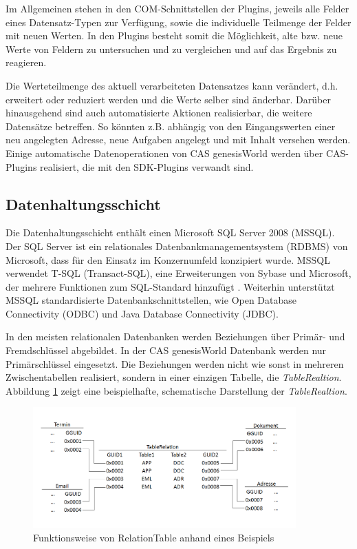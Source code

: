 Im Allgemeinen stehen in den COM-Schnittstellen der Plugins, jeweils alle Felder eines Datensatz-Typen zur Verfügung, sowie die individuelle Teilmenge der Felder mit neuen Werten. In den Plugins besteht somit die Möglichkeit, alte bzw. neue Werte von Feldern zu untersuchen und zu vergleichen und auf das Ergebnis zu reagieren.

Die Werteteilmenge des aktuell verarbeiteten Datensatzes kann verändert, d.h. erweitert oder reduziert werden und die Werte selber sind änderbar. Darüber hinausgehend sind auch automatisierte Aktionen realisierbar, die weitere Datensätze betreffen. So könnten z.B. abhängig von den Eingangswerten einer neu angelegten Adresse, neue Aufgaben angelegt und mit Inhalt versehen werden. Einige automatische Datenoperationen von CAS genesisWorld werden über CAS-Plugins realisiert, die mit den SDK-Plugins verwandt sind.

\subsection{Datenhaltungsschicht}
\label{ch:Systemanalyse:sec:genesisWorld:subsec:db}

Die Datenhaltungsschicht enthält einen Microsoft SQL Server 2008 (MSSQL). Der SQL Server ist ein relationales Datenbankmanagementsystem (RDBMS) von Microsoft, dass für den Einsatz im Konzernumfeld konzipiert wurde. MSSQL verwendet T-SQL (Transact-SQL), eine Erweiterungen von Sybase und Microsoft, der mehrere Funktionen zum SQL-Standard hinzufügt \cite{tech2013}. Weiterhin unterstützt MSSQL standardisierte Datenbankschnittstellen, wie Open Database Connectivity (ODBC) und Java Database Connectivity (JDBC).
  
In den meisten relationalen Datenbanken werden Beziehungen über Primär- und Fremdschlüssel abgebildet. In der CAS genesisWorld Datenbank werden nur Primärschlüssel eingesetzt. Die Beziehungen werden nicht wie sonst in mehreren Zwischentabellen realisiert, sondern in einer einzigen Tabelle, die \textit{TableRealtion}. Abbildung \ref{gw_2} zeigt eine beispielhafte, schematische Darstellung der \textit{TableRealtion}.

\begin{figure}[ht]
	\centering
  \includegraphics[width=0.9\textwidth, width=0.9\textwidth]{pics/gW_tablerealtion.png}
	\caption{Funktionsweise von RelationTable anhand eines Beispiels}
	\label{gw_2}
\end{figure}

